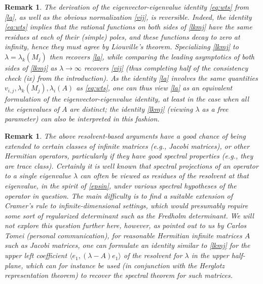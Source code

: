 \documentclass{amsart}
\newtheorem{remark}[lemma]{Remark}
\begin{document}
\begin{remark}\label{reverse} The derivation of the eigenvector-eigenvalue identity \eqref{eq:wts} from \eqref{la}, as well as the obvious normalization \eqref{vij}, is reversible.  Indeed, the identity \eqref{eq:wts} implies that the rational functions on both sides of \eqref{lkmj} have the same residues at each of their (simple) poles, and these functions decay to zero at infinity, hence they must agree by Liouville's theorem.  Specializing \eqref{lkmj} to $\lambda = \lambda_k(M_j)$ then recovers \eqref{la}, while comparing the leading asymptotics of both sides of \eqref{lkmj} as $\lambda \to \infty$ recovers \eqref{vij} (thus completing half of the consistency check (ix) from the introduction).  As the identity \eqref{la} involves the same quantities $v_{i,j}, \lambda_k(M_j), \lambda_i(A)$ as \eqref{eq:wts}, one can thus view \eqref{la} as an equivalent formulation of the eigenvector-eigenvalue identity, at least in the case when all the eigenvalues of $A$ are distinct; the identity \eqref{lkmj} (viewing $\lambda$ as a free parameter) can also be interpreted in this fashion.
\end{remark}

\begin{remark} The above resolvent-based arguments have a good chance of being extended to certain classes of infinite matrices (e.g., Jacobi matrices), or other Hermitian operators, particularly if they have good spectral properties (e.g., they are trace class).  Certainly it is well known that spectral projections of an operator to a single eigenvalue $\lambda$ can often be viewed as residues of the resolvent at that eigenvalue, in the spirit of \eqref{epsin}, under various spectral hypotheses of the operator in question.  The main difficulty is to find a suitable extension of Cramer's rule to infinite-dimensional settings, which would presumably require some sort of regularized determinant such as the Fredholm determinant.  We will not explore this question further here, however, as pointed out to us by Carlos Tomei (personal communication), for reasonable Hermitian infinite matrices $A$ such as Jacobi matrices, one can formulate an identity similar to \eqref{lkmj} for the upper left coefficient $\langle e_1, (\lambda - A) e_1 \rangle$ of the resolvent for $\lambda$ in the upper half-plane, which can for instance be used (in conjunction with the Herglotz representation theorem) to recover the spectral theorem for such matrices.
\end{remark}
\end{document}
